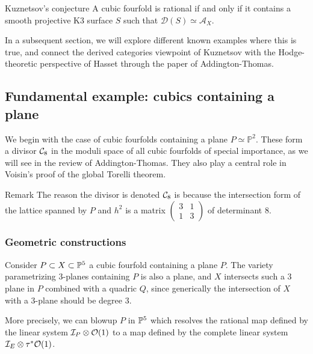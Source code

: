 \begin{conjecture}{}{Kuznetsov's conjecture}
A cubic fourfold is rational if and only if it contains a smooth projective K3 surface $S$ such that $\mathcal{D}(S)\simeq \mathcal{A}_X$.
\end{conjecture}

In a subsequent section, we will explore different known examples where this is true, and connect the derived categories viewpoint of Kuznetsov with the Hodge-theoretic perspective of Hasset through the paper of Addington-Thomas.

\subsection{Fundamental example: cubics containing a plane}
We begin with the case of cubic fourfolds containing a plane $P\simeq \mathbb{P}^2$. These form a divisor $\calC_8$ in the moduli space of all cubic fourfolds of special importance, as we will see in the review of Addington-Thomas. They also play a central role in Voisin's proof of the global Torelli theorem.

\begin{remark}{Remark}{}
    The reason the divisor is denoted $\calC_8$ is because the intersection form of the lattice spanned by $P$ and $h^2$ is a matrix $\begin{pmatrix}
        3 & 1 \\
        1 & 3
    \end{pmatrix}$ of determinant $8$.
    
\end{remark}

\subsubsection{Geometric constructions}

Consider $P\subset X \subset \P^5$ a cubic fourfold containing a plane $P$. The variety parametrizing $3$-planes containing $P$ is also a plane, and $X$ intersects such a $3$ plane in $P$ combined with a quadric $Q$, since generically the intersection of $X$ with a 3-plane should be degree $3$.

More precisely, we can blowup $P$ in $\P^5$ which resolves the rational map defined by the linear system $\calI_P \otimes \O(1)$ to a map defined by the complete linear system $\calI_E \otimes \tau^*\O(1)$.

\begin{center}
\end{center}

